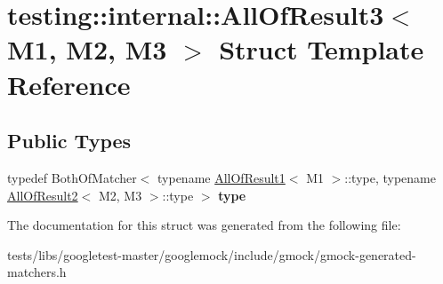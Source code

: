 \hypertarget{structtesting_1_1internal_1_1AllOfResult3}{}\section{testing\+:\+:internal\+:\+:All\+Of\+Result3$<$ M1, M2, M3 $>$ Struct Template Reference}
\label{structtesting_1_1internal_1_1AllOfResult3}
\subsection*{Public Types}
\begin{DoxyCompactItemize}
\item 
\mbox{\label{structtesting_1_1internal_1_1AllOfResult3_a18073a23acd542bccf3a6c5d7f72f957}} 
typedef Both\+Of\+Matcher$<$ typename \hyperlink{structtesting_1_1internal_1_1AllOfResult1}{All\+Of\+Result1}$<$ M1 $>$\+::type, typename \hyperlink{structtesting_1_1internal_1_1AllOfResult2}{All\+Of\+Result2}$<$ M2, M3 $>$\+::type $>$ {\bfseries type}
\end{DoxyCompactItemize}


The documentation for this struct was generated from the following file\+:\begin{DoxyCompactItemize}
\item 
tests/libs/googletest-\/master/googlemock/include/gmock/gmock-\/generated-\/matchers.\+h\end{DoxyCompactItemize}
